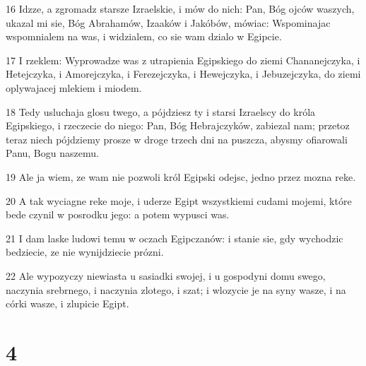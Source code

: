 \par 16 Idzze, a zgromadz starsze Izraelskie, i mów do nich: Pan, Bóg ojców waszych, ukazal mi sie, Bóg Abrahamów, Izaaków i Jakóbów, mówiac: Wspominajac wspomnialem na was, i widzialem, co sie wam dzialo w Egipcie.
\par 17 I rzeklem: Wyprowadze was z utrapienia Egipskiego do ziemi Chananejczyka, i Hetejczyka, i Amorejczyka, i Ferezejczyka, i Hewejczyka, i Jebuzejczyka, do ziemi oplywajacej mlekiem i miodem.
\par 18 Tedy usluchaja glosu twego, a pójdziesz ty i starsi Izraelscy do króla Egipskiego, i rzeczecie do niego: Pan, Bóg Hebrajczyków, zabiezal nam; przetoz teraz niech pójdziemy prosze w droge trzech dni na puszcza, abysmy ofiarowali Panu, Bogu naszemu.
\par 19 Ale ja wiem, ze wam nie pozwoli król Egipski odejsc, jedno przez mozna reke.
\par 20 A tak wyciagne reke moje, i uderze Egipt wszystkiemi cudami mojemi, które bede czynil w posrodku jego: a potem wypusci was.
\par 21 I dam laske ludowi temu w oczach Egipczanów: i stanie sie, gdy wychodzic bedziecie, ze nie wynijdziecie prózni.
\par 22 Ale wypozyczy niewiasta u sasiadki swojej, i u gospodyni domu swego, naczynia srebrnego, i naczynia zlotego, i szat; i wlozycie je na syny wasze, i na córki wasze, i zlupicie Egipt.

\chapter{4}

